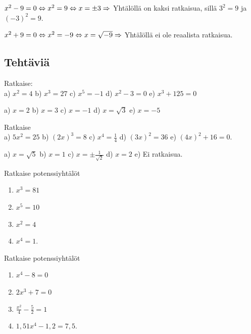 \begin{esimerkki}
$x^2 - 9 = 0 \Leftrightarrow x^2 = 9 \Leftrightarrow x = \pm 3 \\
\Rightarrow$ Yhtälöllä on kaksi ratkaisua, sillä $3^2 = 9$ ja $(-3)^2 = 9$.
\end{esimerkki}

\begin{esimerkki}
$x^2 + 9 = 0 \Leftrightarrow x^2 = -9 \Leftrightarrow x = \sqrt{-9} \\
\Rightarrow$ Yhtälöllä ei ole reaalista ratkaisua.
\end{esimerkki}

\subsection*{Tehtäviä}

\begin{tehtava}
Ratkaise: \\
a) $ x^2 = 4 $ \qquad
b) $ x^3 = 27 $ \qquad
c) $ x^5 = -1 $ \qquad
d) $ x^2 - 3 = 0 $ \qquad
e) $ x^3 + 125 = 0 $
\begin{vastaus}
a) $ x = 2 $ \qquad
b) $ x = 3 $ \qquad
c) $ x = -1 $ \qquad
d) $ x = \sqrt{3} $ \qquad
e) $ x = -5 $ 
\end{vastaus}
\end{tehtava}

\begin{tehtava}
Ratkaise \\
a) $ 5x^2 = 25 $ \qquad
b) $ (2x)^3 = 8 $ \qquad
c) $ x^4 = \frac{1}{4} $ \qquad
d) $ (3x)^2 = 36 $ \qquad
e) $ (4x)^2 + 16 = 0 $.
\begin{vastaus}
a) $ x = \sqrt{5} $ \qquad
b) $ x = 1 $ \qquad
c) $ x = \pm\frac{1}{\sqrt{2}} $ \qquad
d) $ x = 2 $ \qquad
e) Ei ratkaisua. 
\end{vastaus}
\end{tehtava}

\begin{tehtava}
Ratkaise potenssiyhtälöt
\begin{enumerate}
\item $x^3 = 81$
\item $x^5 = 10$
\item $x^2 = 4$
\item $x^4 = 1$.
\end{enumerate}
\end{tehtava}

\begin{tehtava}
Ratkaise potenssiyhtälöt
\begin{enumerate}
\item $x^4 - 8 = 0$
\item $2x^3 + 7 = 0$
\item $\frac{x^2}{4} - \frac{5}{2} = 1$
\item $1,51 x^4 - 1,2 = 7,5$.
\end{enumerate}
\end{tehtava}

